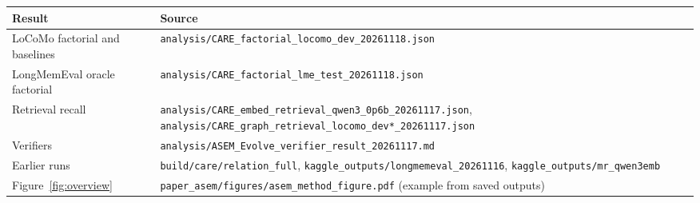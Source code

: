 \documentclass[10pt]{article}
\theoremstyle{plain}
\begin{document}
{\footnotesize
\begin{tabular}{>{\raggedright\arraybackslash}p{4.0cm}>{\raggedright\arraybackslash}p{11.5cm}}
\toprule
Result & Source \\
\midrule
LoCoMo factorial and baselines & \texttt{analysis/\allowbreak CARE\_factorial\_locomo\_dev\_20261118.json} \\
LongMemEval oracle factorial & \texttt{analysis/\allowbreak CARE\_factorial\_lme\_test\_20261118.json} \\
Retrieval recall & \texttt{analysis/\allowbreak CARE\_embed\_retrieval\_qwen3\_0p6b\_20261117.json}, \texttt{analysis/\allowbreak CARE\_graph\_retrieval\_locomo\_dev*\_20261117.json} \\
Verifiers & \texttt{analysis/\allowbreak ASEM\_Evolve\_verifier\_result\_20261117.md} \\
Earlier runs & \texttt{build/care/relation\_full}, \texttt{kaggle\_outputs/\allowbreak longmemeval\_20261116}, \texttt{kaggle\_outputs/\allowbreak mr\_qwen3emb} \\
Figure~\ref{fig:overview} & \texttt{paper\_asem/figures/\allowbreak asem\_method\_figure.pdf} (example from saved outputs) \\
\bottomrule
\end{tabular}}
\end{document}
